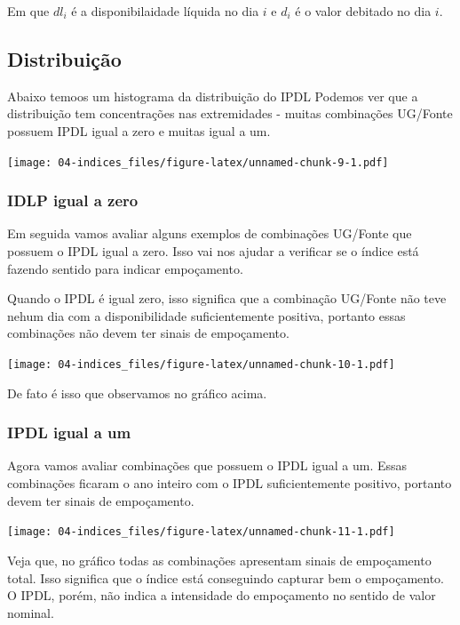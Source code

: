 \documentclass[
]{book}
\begin{document}
Em que \(dl_i\) é a disponibilaidade líquida no dia \(i\) e \(d_i\) é o valor debitado no dia \(i\).

\hypertarget{distribuiuxe7uxe3o-1}{%
\subsection{Distribuição}\label{distribuiuxe7uxe3o-1}}

Abaixo temoos um histograma da distribuição do IPDL Podemos ver que a distribuição tem concentrações nas extremidades - muitas combinações UG/Fonte possuem IPDL igual a zero e muitas igual a um.

\texttt{[image: 04-indices\_files/figure-latex/unnamed-chunk-9-1.pdf]}

\hypertarget{idlp-igual-a-zero}{%
\subsubsection{IDLP igual a zero}\label{idlp-igual-a-zero}}

Em seguida vamos avaliar alguns exemplos de combinações UG/Fonte que possuem o IPDL igual a zero. Isso vai nos ajudar a verificar se o índice está fazendo sentido para indicar empoçamento.

Quando o IPDL é igual zero, isso significa que a combinação UG/Fonte não teve nehum dia com a disponibilidade suficientemente positiva, portanto essas combinações não devem ter sinais de empoçamento.

\texttt{[image: 04-indices\_files/figure-latex/unnamed-chunk-10-1.pdf]}

De fato é isso que observamos no gráfico acima.

\hypertarget{ipdl-igual-a-um}{%
\subsubsection{IPDL igual a um}\label{ipdl-igual-a-um}}

Agora vamos
avaliar combinações que possuem o IPDL igual a um. Essas combinações ficaram o ano inteiro com o IPDL suficientemente positivo, portanto devem ter sinais de empoçamento.

\texttt{[image: 04-indices\_files/figure-latex/unnamed-chunk-11-1.pdf]}

Veja que, no gráfico todas as combinações apresentam sinais de empoçamento total. Isso significa que o índice está conseguindo capturar bem o empoçamento. O IPDL, porém, não indica a intensidade do empoçamento no sentido de valor nominal.
\end{document}
